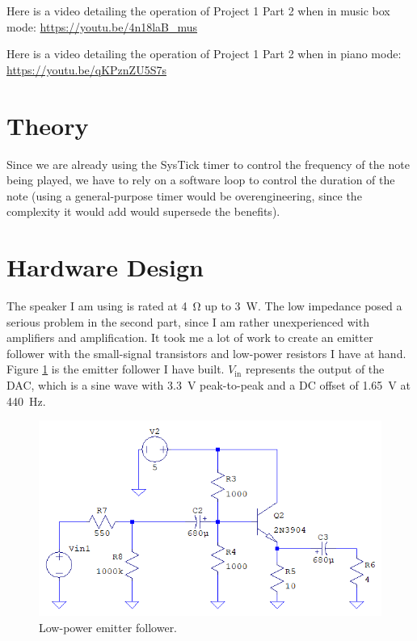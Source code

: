 \documentclass{article}
\begin{document}
Here is a video detailing the operation of Project 1
Part 2 when in music box mode:
\url{https://youtu.be/4n18laB_mus}

Here is a video detailing the operation of Project 1
Part 2 when in piano mode: \url{https://youtu.be/qKPznZU5S7s}

\section{Theory}
Since we are already using the SysTick timer to control the
frequency of the note being played, we have to rely on a
software loop to control the duration of the note (using a
general-purpose timer would be overengineering, since the
complexity it would add would supersede the benefits).

\section{Hardware Design}
The speaker I am using is rated at \SI{4}{\ohm} up to \SI{3}{\watt}.
The low impedance posed a serious problem in the second part,
since I am rather unexperienced with amplifiers and amplification.
It took me a lot of work to create an emitter follower with the
small-signal transistors and low-power resistors I have at hand.
Figure \ref{emitter follower} is the emitter follower I have
built. \(V_\text{in}\) represents the output of the DAC, which
is a sine wave with \SI{3.3}{\volt} peak-to-peak and a DC offset
of \SI{1.65}{\volt} at \SI{440}{\hertz}.

\begin{figure}[H]
	\centering
	\includegraphics[width=\textwidth]{Images/EmitterFollower}
	\caption{Low-power emitter follower.}
	\label{emitter follower}
\end{figure}
\end{document}
